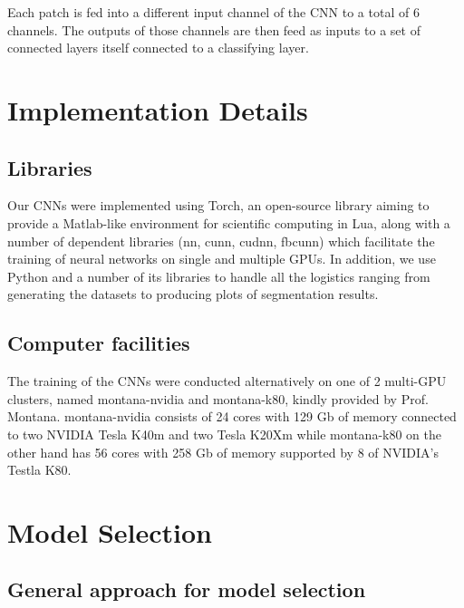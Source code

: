 \noindent Each patch is fed into a different input channel of the CNN to a total of 6 channels. The outputs of those channels are then feed as inputs to a set of connected layers itself connected to a classifying layer.

\section{Implementation Details}

\subsection{Libraries}

\noindent Our CNNs were implemented using Torch, an open-source library aiming to provide a Matlab-like environment for scientific computing in Lua, along with a number of dependent libraries (nn, cunn, cudnn, fbcunn) which facilitate the training of neural networks on single and multiple GPUs. In addition, we use Python and a number of its libraries to handle all the logistics ranging from generating the datasets to producing plots of segmentation results.

\subsection{Computer facilities}

\noindent The training of the CNNs were conducted alternatively on one of 2 multi-GPU clusters, named montana-nvidia and montana-k80, kindly provided by Prof. Montana. montana-nvidia consists of 24 cores with 129 Gb of memory connected to two NVIDIA Tesla K40m and two Tesla K20Xm while montana-k80 on the other hand has 56 cores with 258 Gb of memory supported by 8 of NVIDIA's Testla K80. 

\section{Model Selection}

\subsection{General approach for model selection}

